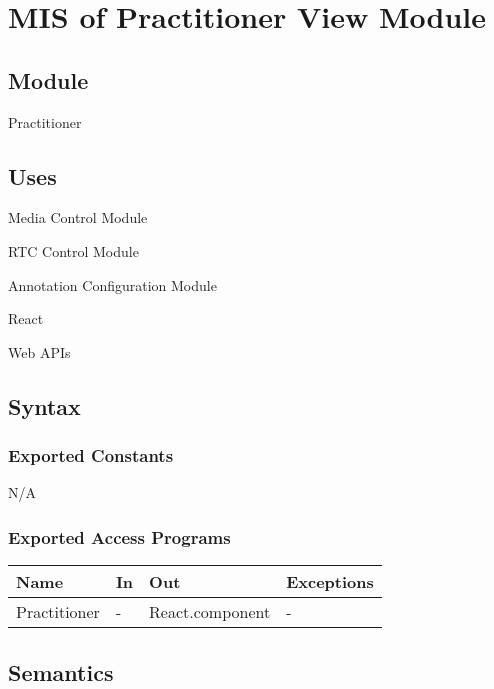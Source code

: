 \documentclass[12pt, titlepage]{article}
\begin{document}
\section{MIS of Practitioner View Module} \label{sec:pracview}

\subsection{Module}

Practitioner

\subsection{Uses}

\noindent Media Control Module

\noindent RTC Control Module

\noindent Annotation Configuration Module

\noindent React

\noindent Web APIs

\subsection{Syntax}

\subsubsection{Exported Constants}

N/A

\subsubsection{Exported Access Programs}

\begin{center}
  \begin{tabular}{p{4cm} p{4cm} p{4cm} p{2cm}}
    \hline
    \textbf{Name}      & \textbf{In} & \textbf{Out}          & \textbf{Exceptions} \\
    \hline
    Practitioner & -     & React.component & -             \\
    \hline
  \end{tabular}
\end{center}

\subsection{Semantics}
\end{document}
